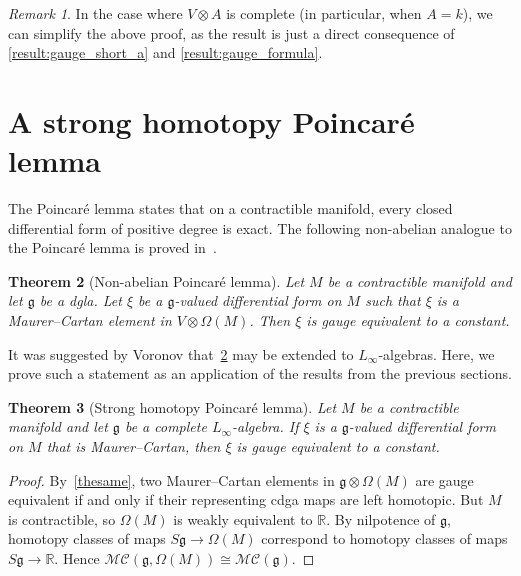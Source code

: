 \documentclass[a4paper,reqno]{amsart}
\theoremstyle{plain}
\newtheorem{thm}{Theorem}[section]
\theoremstyle{definition}
\theoremstyle{remark}
\newtheorem{rem}[thm]{Remark}
\newcommand{\lie}[1]{\mathfrak{#1}}
\begin{document}
\begin{rem}
  In the case where $V \otimes A$ is complete (in particular, when $A=k$), we can simplify the above proof, as the result is just a direct consequence of \cref{result:gauge_short_a} and \cref{result:gauge_formula}.
\end{rem}

\section{A strong homotopy Poincar\'e lemma}
\label{application}

The Poincar\'e lemma states that on a contractible manifold, every closed differential form of positive degree is exact.
The following non-abelian analogue to the Poincar\'e lemma is proved in~\cite[Theorem 3.1]{vor12}.  

\begin{thm}[Non-abelian Poincar\'e lemma]
  \label{result:poincare_dgla}
  Let $M$ be a contractible manifold and let $\lie{g}$ be a dgla. 
  Let $\xi$ be a $\lie{g}$-valued differential form on $M$ such that $\xi$ is a Maurer--Cartan element in $V \otimes \Omega(M)$. Then $\xi$ is gauge equivalent to a constant.
\end{thm}

It was suggested by Voronov that~\cref{result:poincare_dgla} may be extended to $L_{\infty}$-algebras. 
Here, we prove such a statement as an application of the results from the previous sections. 

\begin{thm}[Strong homotopy Poincar\'e lemma]
  Let $M$ be a contractible manifold and let $\lie{g}$ be a complete $L_{\infty}$-algebra. 
  If\/ $\xi$ is a $\lie{g}$-valued differential form on $M$ that is Maurer--Cartan, then $\xi$ is gauge equivalent to a constant.
\end{thm}

\begin{proof}
  By~\cref{thesame}, two Maurer--Cartan elements in $\lie{g} \otimes \Omega(M)$ are gauge equivalent if and only if their representing cdga maps are left homotopic. 
  But $M$ is contractible, so $\Omega(M)$ is weakly equivalent to $\mathbb{R}$. By nilpotence of $\lie{g}$, homotopy classes of maps $S\lie{g} \to \Omega(M)$ correspond to homotopy classes of maps $S\lie{g} \to \mathbb{R}$. Hence $\mathscr{MC}(\lie{g},\Omega(M)) \cong \mathscr{MC}(\lie{g})$.
\end{proof}
\end{document}
